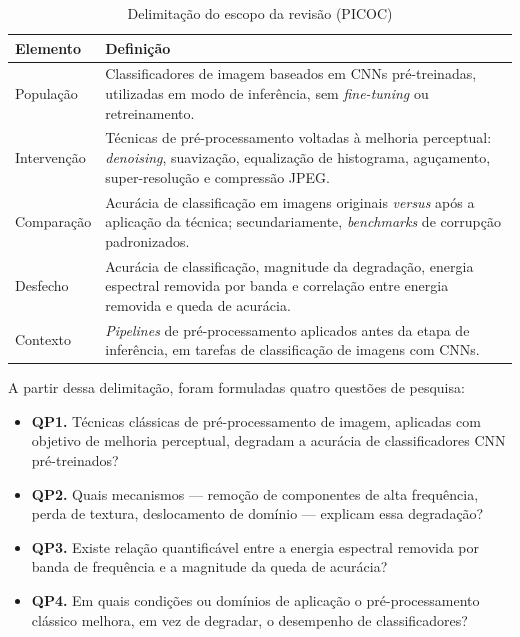 \documentclass[conference]{IEEEtran}
\begin{document}
\begin{table}[htbp]
\caption{Delimitação do escopo da revisão (PICOC)}
\begin{center}
\begin{tabular}{|p{1.4cm}|p{6.1cm}|}
\hline
\textbf{Elemento} & \textbf{Definição} \\
\hline
População &
Classificadores de imagem baseados em CNNs pré-treinadas, utilizadas em modo
de inferência, sem \textit{fine-tuning} ou retreinamento. \\
\hline
Intervenção &
Técnicas de pré-processamento voltadas à melhoria perceptual:
\textit{denoising}, suavização, equalização de histograma, aguçamento,
super-resolução e compressão JPEG. \\
\hline
Comparação &
Acurácia de classificação em imagens originais \textit{versus} após a
aplicação da técnica; secundariamente, \textit{benchmarks} de corrupção
padronizados. \\
\hline
Desfecho &
Acurácia de classificação, magnitude da degradação, energia espectral removida
por banda e correlação entre energia removida e queda de acurácia. \\
\hline
Contexto &
\textit{Pipelines} de pré-processamento aplicados antes da etapa de
inferência, em tarefas de classificação de imagens com CNNs. \\
\hline
\end{tabular}
\label{tab:picoc}
\end{center}
\end{table}

A partir dessa delimitação, foram formuladas quatro questões de pesquisa:

\begin{itemize}
\item \textbf{QP1.} Técnicas clássicas de pré-processamento de imagem,
aplicadas com objetivo de melhoria perceptual, degradam a acurácia de
classificadores CNN pré-treinados?
\item \textbf{QP2.} Quais mecanismos --- remoção de componentes de alta
frequência, perda de textura, deslocamento de domínio --- explicam essa
degradação?
\item \textbf{QP3.} Existe relação quantificável entre a energia espectral
removida por banda de frequência e a magnitude da queda de acurácia?
\item \textbf{QP4.} Em quais condições ou domínios de aplicação o
pré-processamento clássico melhora, em vez de degradar, o desempenho de
classificadores?
\end{itemize}
\end{document}

